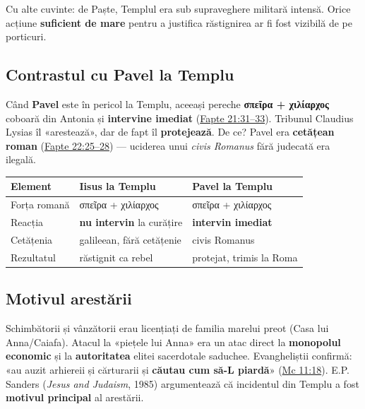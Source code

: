 \documentclass[12pt,a4paper,twoside,openany]{book}
\begin{document}
Cu alte cuvinte: de Paște, Templul era sub supraveghere militară intensă. Orice acțiune \textbf{suficient de mare} pentru a justifica răstignirea ar fi fost vizibilă de pe porticuri.

\subsection{Contrastul cu Pavel la Templu}

Când \textbf{Pavel} este în pericol la Templu, aceeași pereche \textbf{σπεῖρα + χιλίαρχος} coboară din Antonia și \textbf{intervine imediat} (\href{https://bibliaortodoxa.ro/carte.php?id=26\&cap=21\#31}{Fapte 21:31--33}). Tribunul Claudius Lysias îl «arestează», dar de fapt îl \textbf{protejează}. De ce? Pavel era \textbf{cetățean roman} (\href{https://bibliaortodoxa.ro/carte.php?id=26\&cap=22\#25}{Fapte 22:25--28}) — uciderea unui \textit{civis Romanus} fără judecată era ilegală.

\begin{center}
\small
\begin{tabularx}{\textwidth}{L{3cm}L{5.5cm}X}
\toprule
{}
\textbf{Element} & \textbf{Iisus la Templu} & \textbf{Pavel la Templu} \\
\midrule
Forța romană & σπεῖρα + χιλίαρχος & σπεῖρα + χιλίαρχος \\
Reacția & \textbf{nu intervin} la curățire & \textbf{intervin imediat} \\
Cetățenia & galileean, fără cetățenie & civis Romanus \\
Rezultatul & răstignit ca rebel & protejat, trimis la Roma \\
\bottomrule
\end{tabularx}
\end{center}

\subsection{Motivul arestării}

Schimbătorii și vânzătorii erau licențiați de familia marelui preot (Casa lui Anna/Caiafa). Atacul la «piețele lui Anna» era un atac direct la \textbf{monopolul economic} și la \textbf{autoritatea} elitei sacerdotale saduchee. Evangheliștii confirmă: «au auzit arhiereii și cărturarii și \textbf{căutau cum să-L piardă}» (\href{https://bibliaortodoxa.ro/carte.php?id=53\&cap=11\#18}{Mc 11:18}). E.P. Sanders (\textit{Jesus and Judaism}, 1985) argumentează că incidentul din Templu a fost \textbf{motivul principal} al arestării.
\end{document}
